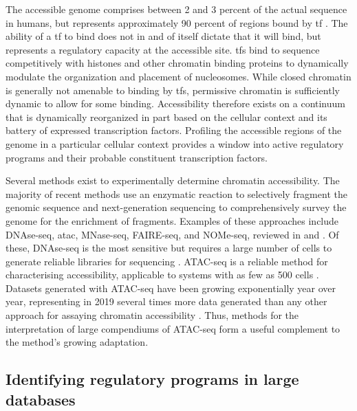 The accessible genome comprises between 2 and 3 percent of the actual sequence in humans, but represents approximately 90 percent of regions bound by \gls{tf} \cite{Thurman2012}. The ability of a \gls{tf} to bind does not in and of itself dictate that it will bind, but represents a regulatory capacity at the accessible site. \Glspl{tf} bind to sequence competitively with histones and other chromatin binding proteins to dynamically modulate the organization and placement of nucleosomes. While closed chromatin is generally not amenable to binding by \glspl{tf}, permissive chromatin is sufficiently dynamic to allow for some binding. Accessibility therefore exists on a continuum that is dynamically reorganized in part based on the cellular context and its battery of expressed transcription factors.  Profiling the accessible regions of the genome in a particular cellular context provides a window into active regulatory programs and their probable constituent transcription factors. 

Several methods exist to experimentally determine chromatin accessibility. The majority of recent methods use an enzymatic reaction to selectively fragment the genomic sequence and next-generation sequencing to comprehensively survey the genome for the enrichment of fragments. Examples of these approaches include DNAse-seq, \gls{atac}, MNase-seq, FAIRE-seq, and NOMe-seq, reviewed in \textcite{Klemm} and \textcite{Meyer2014}. Of these, DNAse-seq is the most sensitive but requires a large number of cells to generate reliable libraries for sequencing \cite{Boyle2008}. ATAC-seq is a reliable method for characterising accessibility, applicable to systems with as few as 500 cells \cite{Corces2017}. Datasets generated with ATAC-seq have been growing exponentially year over year, representing in 2019 several times more data generated than any other approach for assaying chromatin accessibility \cite{Yan2020}. Thus, methods for the interpretation of large compendiums of ATAC-seq form a useful complement to the method's growing adaptation. 

\subsection{Identifying regulatory programs in large databases}


